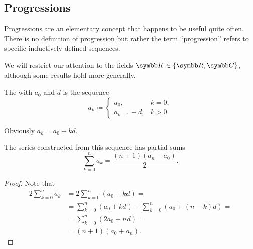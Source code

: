 \subsection{Progressions}\label{subsec:progressions}

\begin{remark}\label{remark:progressions}
  Progressions are an elementary concept that happens to be useful quite often. There is no definition of progression but rather the term \enquote{progression} refers to specific inductively defined sequences.

  We will restrict our attention to the fields \( \K \in \{ \R, \C \} \), although some results hold more generally.
\end{remark}

\begin{definition}\label{def:arithmetic_progression}
  The  with  \( a_0 \) and  \( d \) is the sequence
  \begin{equation*}
    a_k \coloneqq \begin{cases}
      a_0, &k = 0, \\
      a_{k-1} + d, &k > 0.
    \end{cases}
  \end{equation*}

  \begin{defenum}
     Obviously \( a_k = a_0 + kd \).

     The series constructed from this sequence has partial sums
    \begin{equation*}
      \sum_{k=0}^n a_k = \frac {(n + 1) (a_n - a_0)} 2.
    \end{equation*}
  \end{defenum}
\end{definition}
\begin{proof}
  Note that
  \begin{align*}
    2 \sum_{k=0}^n a_k
    &=
    2 \sum_{k=0}^n (a_0 + kd)
    = \\ &=
    \sum_{k=0}^n (a_0 + kd) + \sum_{k=0}^n (a_0 + (n-k)d)
    = \\ &=
    \sum_{k=0}^n (2 a_0 + nd)
    = \\ &=
    (n + 1) (a_0 + a_n).
  \end{align*}
\end{proof}

